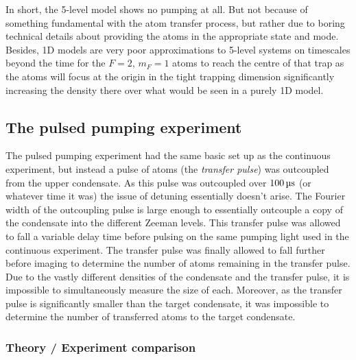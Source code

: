 In short, the 5-level model shows no pumping at all. But not because of something fundamental with the atom transfer process, but rather due to boring technical details about providing the atoms in the appropriate state and mode.  Besides, 1D models are very poor approximations to 5-level systems on timescales beyond the time for the $F=2$, $m_F=1$ atoms to reach the centre of that trap as the atoms will focus at the origin in the tight trapping dimension significantly increasing the density there over what would be seen in a purely 1D model.

\subsection{The pulsed pumping experiment}

The pulsed pumping experiment had the same basic set up as the continuous experiment, but instead a pulse of atoms (the \emph{transfer pulse}) was outcoupled from the upper condensate.  As this pulse was outcoupled over $\unit[100]{\micro s}$ (or whatever time it was) the issue of detuning essentially doesn't arise.  The Fourier width of the outcoupling pulse is large enough to essentially outcouple a copy of the condensate into the different Zeeman levels.  This transfer pulse was allowed to fall a variable delay time before pulsing on the same pumping light used in the continuous experiment.  The transfer pulse was finally allowed to fall further before imaging to determine the number of atoms remaining in the transfer pulse.  Due to the vastly different densities of the condensate and the transfer pulse, it is impossible to simultaneously measure the size of each.  Moreover, as the transfer pulse is significantly smaller than the target condensate, it was impossible to determine the number of transferred atoms to the target condensate.

\subsubsection{Theory / Experiment comparison}

